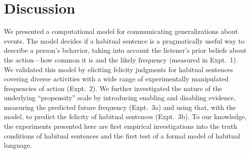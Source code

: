 \documentclass[10pt,letterpaper]{article}
\begin{document}


%
%
%
%



\section{Discussion}
We presented a computational model for communicating generalizations about events.
The model decides if a habitual sentence is a pragmatically useful way to describe a person's behavior, taking into account the listener's prior beliefs about the action---how common it is and the likely frequency (measured in Expt.~1).
We validated this model by eliciting felicity judgments for habitual sentences covering diverse activities with a wide range of experimentally manipulated frequencies of action (Expt.~2).
We further investigated the nature of the underlying ``propensity'' scale by introducing enabling and disabling evidence, measuring the predicted future frequency (Expt.~3a) and using that, with the model, to predict the felicity of habitual sentences (Expt.~3b). 
To our knowledge, the experiments presented here are first empirical investigations into the truth conditions of habitual sentences and the first test of a formal model of habitual language.
\end{document}
